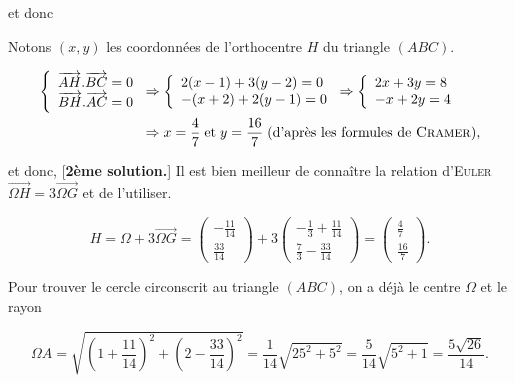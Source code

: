 {\begin{enumerate}
{et donc 


Notons $(x,y)$ les coordonnées de l'orthocentre $H$ du triangle $(ABC)$.

\begin{itemize}

\begin{align*}
\left\{
\begin{array}{l}
\overrightarrow{AH}.\overrightarrow{BC}=0\\
\overrightarrow{BH}.\overrightarrow{AC}=0
\end{array}
\right.&
\Rightarrow
\left\{
\begin{array}{l}
2(x-1)+3(y-2)=0\\
-(x+2)+2(y-1)=0
\end{array}
\right.
\Rightarrow
\left\{
\begin{array}{l}
2x+3y=8\\
-x+2y=4
\end{array}
\right.\\
 &\Rightarrow x=\frac{4}{7}\;\mbox{et}\;y=\frac{16}{7}\;(\mbox{d'après les formules de \textsc{Cramer}}),
\end{align*}

et donc, 
[\textbf{2ème solution.}] Il est bien meilleur de connaître la relation d'\textsc{Euler} $\overrightarrow{\Omega H}=3\overrightarrow{\Omega G}$ et de l'utiliser.

$$H=\Omega+3\overrightarrow{\Omega G}
=\left(
\begin{array}{c}
-\frac{11}{14}\\
\frac{33}{14}
\end{array}
\right)+3\left(
\begin{array}{c}
-\frac{1}{3}+\frac{11}{14}\\
\frac{7}{3}-\frac{33}{14}
\end{array}
\right)
=
\left(
\begin{array}{c}
\frac{4}{7}\\
\frac{16}{7}
\end{array}
\right).$$

\end{itemize}

Pour trouver le cercle circonscrit au triangle $(ABC)$, on a déjà le centre $\Omega$ et le rayon 

$$\Omega A=\sqrt{(1+\frac{11}{14})^2+(2-\frac{33}{14})^2}=\frac{1}{14}\sqrt{25^2+5^2}=\frac{5}{14}\sqrt{5^2+1}=\frac{5\sqrt{26}}{14}.$$

}
\end{enumerate}}
